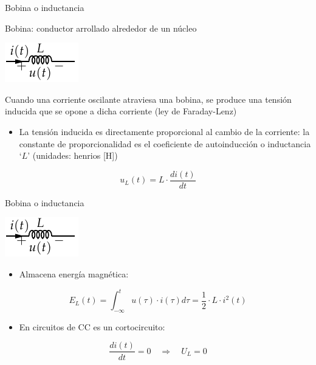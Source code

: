 \documentclass[aspectratio=169, xcolor={usenames,svgnames,dvipsnames}]{beamer}
\begin{document}
\begin{frame}{Bobina o inductancia}

    \vspace{3mm}
    \alert{Bobina:} conductor arrollado alrededor de un núcleo
    \begin{center}
    \includegraphics[height=0.2\textheight]{../figs/Bobina.pdf}
    \end{center}

    Cuando una corriente oscilante atraviesa una bobina, se produce una \alert{tensión inducida que se opone a dicha corriente} (ley de Faraday-Lenz)

    \begin{itemize}
        \item La tensión inducida es directamente \alert{proporcional al cambio de la corriente}: la constante de proporcionalidad es el coeficiente de autoinducción o \alert{inductancia} `$L$' (unidades: henrios [H])
    \end{itemize}
    \[
        \boxed{ u_L(t)=L\cdot\frac{di(t)}{dt} } %
    \]
    
\end{frame}


\begin{frame}{Bobina o inductancia}
    \begin{center}
    \includegraphics[height=0.2\textheight]{../figs/Bobina.pdf}
    \end{center}
    
    \begin{itemize}
    \item Almacena \alert{energía magnética}:
    \end{itemize}
    \[
      E_L(t) = \int_{-\infty}^t u(\tau) \cdot i(\tau) d\tau = \frac{1}{2} \cdot L \cdot i^2(t)
    \]
    \begin{itemize}
    \item En circuitos de CC es un \alert{cortocircuito}:
    \end{itemize}
    \begin{equation*}
      \frac{di(t)}{dt} = 0 \quad \Rightarrow \quad U_L = 0
    \end{equation*}
\end{frame}
\end{document}
